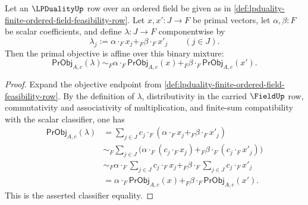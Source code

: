 \begin{lemma}
\label{lem:lpduality-primal-objective-binary-affine-readback}
Let an $\LPDualityUp$ row over an ordered field be given as in \autoref{def:lpduality-finite-ordered-field-feasibility-row}. Let $x,x':J\to F$ be primal vectors, let $\alpha,\beta:F$ be scalar coefficients, and define $\lambda:J\to F$ componentwise by
$$
\lambda_j:=\alpha\cdot_F x_j+_F\beta\cdot_F x'_j
\qquad (j\in J).
$$
Then the primal objective is affine over this binary mixture:
$$
\mathsf{PrObj}_{A,c}(\lambda)
\sim_F
\alpha\cdot_F\mathsf{PrObj}_{A,c}(x)+_F
\beta\cdot_F\mathsf{PrObj}_{A,c}(x').
$$
\end{lemma}
\begin{proof}
Expand the objective endpoint from \autoref{def:lpduality-finite-ordered-field-feasibility-row}. By the definition of $\lambda$, distributivity in the carried $\FieldUp$ row, commutativity and associativity of multiplication, and finite-sum compatibility with the scalar classifier, one has
$$
\begin{aligned}
\mathsf{PrObj}_{A,c}(\lambda)
&=\sum_{j\in J}c_j\cdot_F(\alpha\cdot_F x_j+_F\beta\cdot_F x'_j)\\
&\sim_F
\sum_{j\in J}\bigl(\alpha\cdot_F(c_j\cdot_Fx_j)+_F
\beta\cdot_F(c_j\cdot_Fx'_j)\bigr)\\
&\sim_F
\alpha\cdot_F\sum_{j\in J}c_j\cdot_Fx_j
+_F
\beta\cdot_F\sum_{j\in J}c_j\cdot_Fx'_j\\
&=
\alpha\cdot_F\mathsf{PrObj}_{A,c}(x)+_F
\beta\cdot_F\mathsf{PrObj}_{A,c}(x').
\end{aligned}
$$
This is the asserted classifier equality.
\end{proof}

